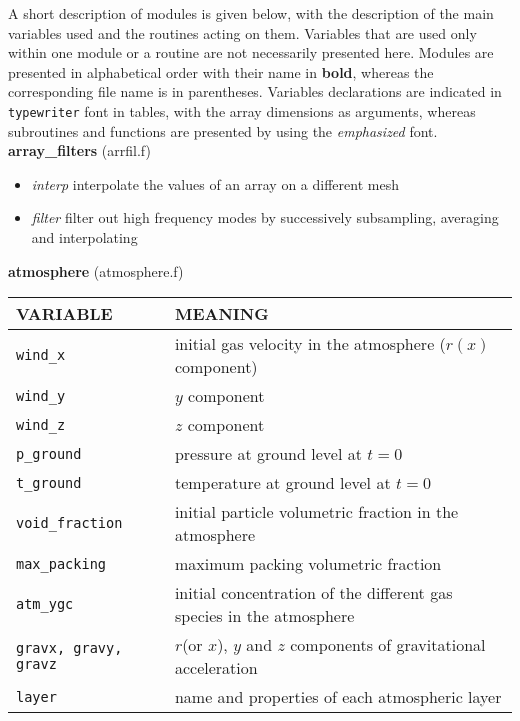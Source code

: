 A short description of modules is given below, with the description of the main 
variables used and the routines acting on them. Variables that are used only within one
module or a routine are not necessarily presented here.
Modules are presented in alphabetical order with their name in {\bf bold}, whereas the corresponding
file name is in parentheses. 
Variables declarations are indicated in {\tt typewriter} font in tables, 
with the array dimensions as arguments, whereas subroutines and functions
are presented by using the {\em emphasized} font.\\[5mm]
%
%
{\large {\bf array\_filters}} (arrfil.f)\\
\begin{itemize}
\item {\em interp} interpolate the values of an array on a different mesh
\item{\em filter} filter out high frequency modes by successively subsampling, averaging and interpolating
\end{itemize}
%
%
{\large {\bf atmosphere}} (atmosphere.f)\\[5mm]
\begin{tabular}{|p{6cm}|p{6cm}|} \hline
VARIABLE & MEANING\\\hline
\tt wind\_x         & initial gas velocity in the atmosphere ($r(x)$ component)\\\hline
\tt wind\_y         & $y$ component\\\hline
\tt wind\_z         & $z$ component\\\hline
\tt p\_ground         & pressure at ground level at $t=0$\\ \hline
\tt t\_ground         & temperature at ground level at $t=0$\\ \hline
\tt void\_fraction    & initial particle volumetric fraction in the atmosphere\\\hline
\tt max\_packing      & maximum packing volumetric fraction \\\hline
\tt atm\_ygc          & initial concentration of the different gas species in the atmosphere \\\hline
\tt gravx, gravy, gravz & $r$(or $x$), $y$ and $z$ components of gravitational acceleration\\ \hline
\tt layer             & name and properties of each atmospheric layer\\ \hline
\end{tabular}\\

